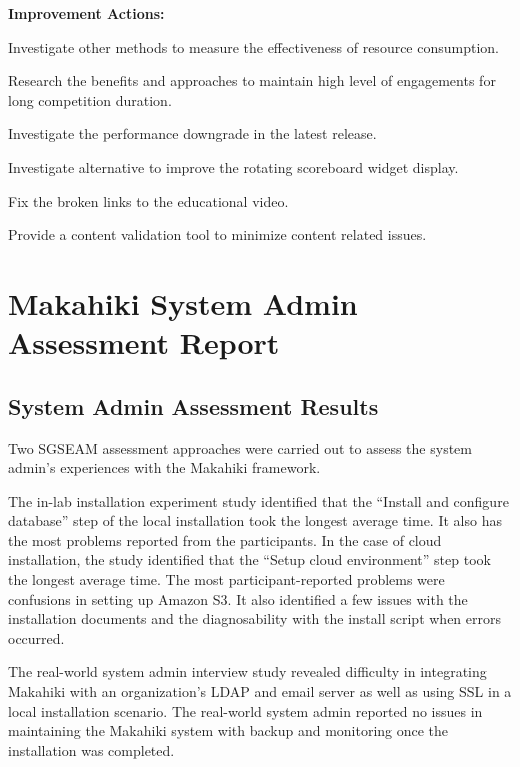 \begin{table}[ht!]
\begin{shadebox}

{\bf Improvement Actions:}
 \begin{compactenum}
	\item Investigate other methods to measure the effectiveness of resource consumption. 
	\item Research the benefits and approaches to maintain high level of engagements for long competition duration.
	\item Investigate the performance downgrade in the latest release.
	\item Investigate alternative to improve the rotating scoreboard widget display.
	\item Fix the broken links to the educational video.
	\item Provide a content validation tool to minimize content related issues.
\end{compactenum}
\end{shadebox}
\caption{SGSEAM Improvement Action Report from Player's Perspective}

\label{table:player-report}
\end{table}

\section{Makahiki System Admin Assessment Report}

\subsection{System Admin Assessment Results}

Two SGSEAM assessment approaches were carried out to assess the system admin's experiences with the Makahiki framework. 

The in-lab installation experiment study identified that the ``Install and configure database'' step of the local installation took the longest average time. It also has the most problems reported from the participants. In the case of cloud installation, the study identified that the ``Setup cloud environment'' step took the longest average time. The most participant-reported problems were confusions in setting up Amazon S3. It also identified a few issues with the installation documents and the diagnosability with the install script when errors occurred.

The real-world system admin interview study revealed difficulty in integrating Makahiki with an organization's LDAP and email server as well as using SSL in a local installation scenario. The real-world system admin reported no issues in maintaining the Makahiki system with backup and monitoring once the installation was completed.

